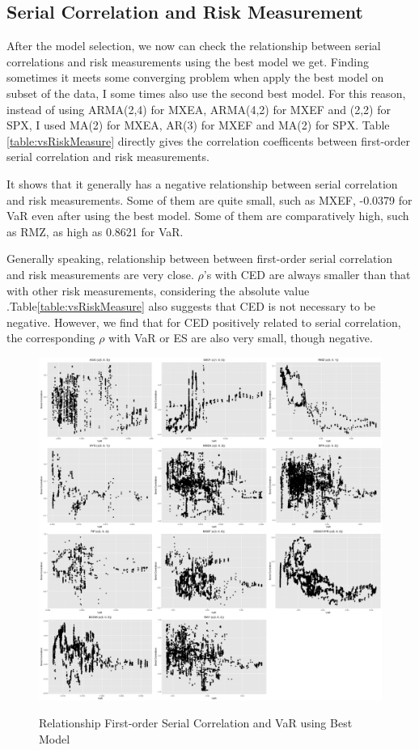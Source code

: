 \documentclass[12pt]{article}
\begin{document}
\subsection{Serial Correlation and Risk Measurement}
After the model selection, we now can check the relationship between serial correlations and risk measurements using the best model we get. Finding sometimes it meets some converging problem when apply the best model on subset of the data, I some times also use the second best model. For this reason, instead of  using ARMA(2,4) for MXEA, ARMA(4,2) for MXEF and (2,2) for SPX, I used MA(2) for MXEA,  AR(3) for MXEF and MA(2) for SPX. Table \ref{table:vsRiskMeasure} directly gives the correlation coefficents between first-order serial correlation and risk measurements.

It shows that it generally has a negative relationship between serial correlation and risk measurements. Some of them are quite small, such as MXEF, -0.0379 for VaR even after using the best model. Some of them are comparatively high, such as RMZ, as high as 0.8621 for VaR.

 Generally speaking,  relationship between between first-order serial correlation and risk measurements are very close. $\rho$'s with CED are always smaller than that with other risk measurements, considering the absolute value .Table\ref{table:vsRiskMeasure} also suggests that CED is not necessary to be negative. However, we find that for CED positively related to serial correlation, the corresponding $\rho$ with VaR or ES are also very small, though negative. 


\begin{figure}
  \caption{Relationship First-order Serial Correlation and VaR using Best Model}
  \includegraphics[width = \textwidth]{../figures/SerCol-VaR2yr}
  \label{fig:SerCol-VaR2yr}
\end{figure}
\end{document}
